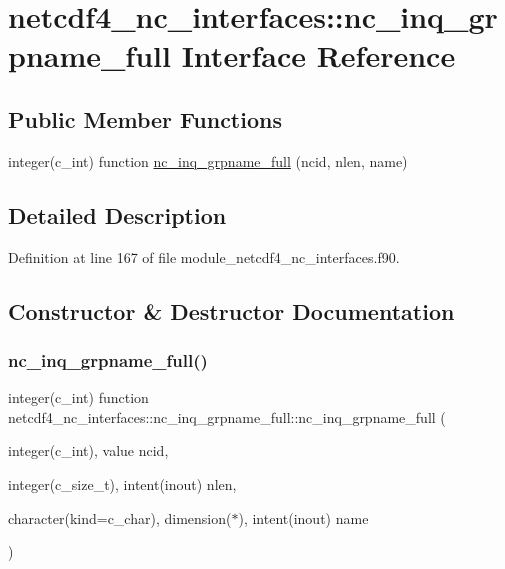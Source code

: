 \hypertarget{interfacenetcdf4__nc__interfaces_1_1nc__inq__grpname__full}{}\section{netcdf4\+\_\+nc\+\_\+interfaces\+:\+:nc\+\_\+inq\+\_\+grpname\+\_\+full Interface Reference}
\label{interfacenetcdf4__nc__interfaces_1_1nc__inq__grpname__full}
\subsection*{Public Member Functions}
\begin{DoxyCompactItemize}
\item 
integer(c\+\_\+int) function \hyperlink{interfacenetcdf4__nc__interfaces_1_1nc__inq__grpname__full_a178a1940e5bf1481c4c4dc9aa1d72895}{nc\+\_\+inq\+\_\+grpname\+\_\+full} (ncid, nlen, name)
\end{DoxyCompactItemize}


\subsection{Detailed Description}


Definition at line 167 of file module\+\_\+netcdf4\+\_\+nc\+\_\+interfaces.\+f90.



\subsection{Constructor \& Destructor Documentation}
\mbox{\label{interfacenetcdf4__nc__interfaces_1_1nc__inq__grpname__full_a178a1940e5bf1481c4c4dc9aa1d72895}} 
\subsubsection{\texorpdfstring{nc\+\_\+inq\+\_\+grpname\+\_\+full()}{nc\_inq\_grpname\_full()}}
{\footnotesize\ttfamily integer(c\+\_\+int) function netcdf4\+\_\+nc\+\_\+interfaces\+::nc\+\_\+inq\+\_\+grpname\+\_\+full\+::nc\+\_\+inq\+\_\+grpname\+\_\+full (\begin{DoxyParamCaption}\item[{integer(c\+\_\+int), value}]{ncid,  }\item[{integer(c\+\_\+size\+\_\+t), intent(inout)}]{nlen,  }\item[{character(kind=c\+\_\+char), dimension($\ast$), intent(inout)}]{name }\end{DoxyParamCaption})}



